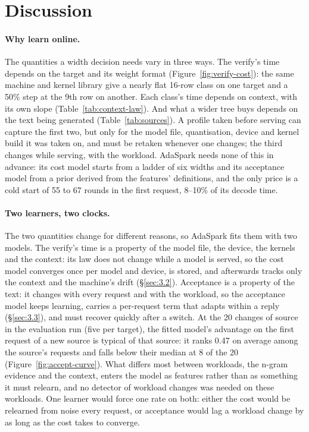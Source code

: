 \documentclass[10pt,twocolumn,letterpaper]{article}
\begin{document}
\section{Discussion}\label{sec:5}

\paragraph{Why learn online.} The quantities a width decision needs vary in three ways. The verify's time depends on the target and its weight format (Figure~\ref{fig:verify-cost}): the same machine and kernel library give a nearly flat 16-row class on one target and a 50\% step at the 9th row on another. Each class's time depends on context, with its own slope (Table~\ref{tab:context-law}). And what a wider tree buys depends on the text being generated (Table~\ref{tab:sources}). A profile taken before serving can capture the first two, but only for the model file, quantisation, device and kernel build it was taken on, and must be retaken whenever one changes; the third changes while serving, with the workload. AdaSpark needs none of this in advance: its cost model starts from a ladder of six widths and its acceptance model from a prior derived from the features' definitions, and the only price is a cold start of 55 to 67 rounds in the first request, 8--10\% of its decode time.

\paragraph{Two learners, two clocks.} The two quantities change for different reasons, so AdaSpark fits them with two models. The verify's time is a property of the model file, the device, the kernels and the context: its law does not change while a model is served, so the cost model converges once per model and device, is stored, and afterwards tracks only the context and the machine's drift (\S\ref{sec:3.2}). Acceptance is a property of the text: it changes with every request and with the workload, so the acceptance model keeps learning, carries a per-request term that adapts within a reply (\S\ref{sec:3.3}), and must recover quickly after a switch. At the 20 changes of source in the evaluation run (five per target), the fitted model's advantage on the first request of a new source is typical of that source: it ranks 0.47 on average among the source's requests and falls below their median at 8 of the 20 (Figure~\ref{fig:accept-curve}). What differs most between workloads, the n-gram evidence and the context, enters the model as features rather than as something it must relearn, and no detector of workload changes was needed on these workloads. One learner would force one rate on both: either the cost would be relearned from noise every request, or acceptance would lag a workload change by as long as the cost takes to converge.
\end{document}

